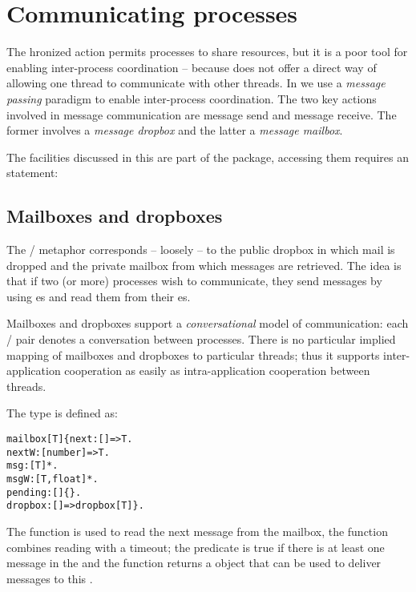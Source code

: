 \chapter{Communicating processes}
\label{message}


The hronized action permits processes to share resources, but it is a poor tool for enabling inter-process coordination -- because  does not offer a direct way of allowing one thread to communicate with other threads. In \go we use a \emph{message passing} paradigm to enable inter-process coordination. The two key actions involved in message communication are message send and message receive. The former involves a \emph{message dropbox} and the latter a \emph{message mailbox}.

The facilities discussed in this are part of the  package, accessing them requires an  statement:


\section{Mailboxes and dropboxes}
\label{threads:mailbox}

The / metaphor corresponds -- loosely -- to the public dropbox in which mail is dropped and the private mailbox from which messages are retrieved. The idea is that if two (or more) processes wish to communicate, they send messages by using es and read them from their es. 

Mailboxes and dropboxes support a \emph{conversational} model of communication: each / pair denotes a conversation between processes. There is no particular implied mapping of mailboxes and dropboxes to particular \go threads; thus it supports inter-application cooperation as easily as intra-application cooperation between threads.

The  type is defined as:
\begin{alltt}
mailbox[T] \impl \{ next:[]=>T.
    nextW:[number]=>T.
    msg:[T]*.
    msgW:[T,float]*.
    pending:[]\{\}.
    dropbox:[]=>dropbox[T] \}.
\end{alltt}
The  function is used to read the next message from the mailbox, the  function combines reading with a timeout; the  predicate is true if there is at least one message in the  and the  function returns a  object that can be used to deliver messages to this .

